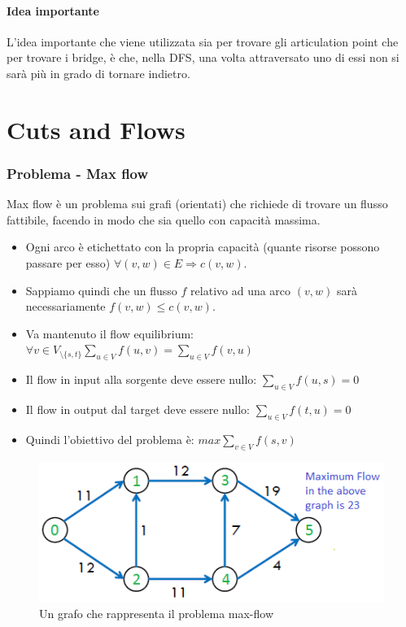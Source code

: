 \documentclass[12pt,a4paper]{article}
\begin{document}
\subsection{Idea importante}
L'idea importante che viene utilizzata sia per trovare gli articulation point che per trovare i bridge, è che, nella DFS, una volta attraversato uno di essi non si sarà più in grado di tornare indietro.

\pagebreak
\part{Cuts and Flows}

\section{Problema - Max flow}
Max flow è un problema sui grafi (orientati) che richiede di trovare un flusso fattibile, facendo in modo che sia quello con capacità massima.

\begin{itemize}
\item Ogni arco è etichettato con la propria capacità (quante risorse possono passare per esso) $\forall (v, w) \in E \Rightarrow c(v, w)$.
\item Sappiamo quindi che un flusso $f$ relativo ad una arco $(v, w)$ sarà necessariamente $f(v, w) \leq c(v, w)$.
\item Va mantenuto il flow equilibrium: $\forall v \in V_{\setminus \lbrace s, t \rbrace} \sum_{u \in V} f(u, v) = \sum_{u \in V} f(v, u)$
\item Il flow in input alla sorgente deve essere nullo: $\sum_{u \in V} f(u, s) = 0$
\item Il flow in output dal target deve essere nullo: $\sum_{u \in V} f(t, u) = 0$
\item Quindi l'obiettivo del problema è: $max \sum_{v \in V} f(s, v) $
\end{itemize}

\begin{figure}[h]
	\centering
	\includegraphics[width=0.7\linewidth]{img/ford_fulkerson2.png}
	\caption{Un grafo che rappresenta il problema max-flow}
	\label{fig:max flow graph}
\end{figure}
\end{document}
